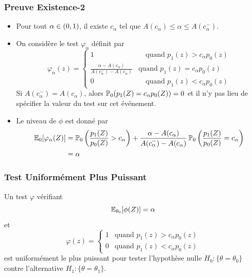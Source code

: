\begin{frame}
\frametitle{Preuve Existence-2}
\begin{itemize}
\item Pour tout $\alpha \in \left(0,1\right)$, il existe $c_\alpha$ tel que $A(c_\alpha) \leq \alpha \leq A(c_\alpha^-)$.
\item On considère le test $\varphi_\alpha$ définit par
$$
\varphi_\alpha(z)
=
\begin{cases}
1 & \quad \text{quand $p_1(z) > c_\alpha p_0(z)$} \\
\frac{\alpha - A(c_\alpha)}{A(c_\alpha^-)-A(c_\alpha)} & \text{quand $p_1(z) = c_\alpha p_0(z)$} \\
0  & \quad \text{quand $p_1(z) < c_\alpha p_0(z)$}
\end{cases}
$$
Si $A(c_\alpha^-)  = A(c_\alpha)$, alors $\operatorname{{\mathbb P}}_0( p_1(Z)= c_\alpha p_0(Z))=0$ et il n'y pas lieu de spécifier la valeur du test sur cet événement.
\item Le niveau de $\phi$ est donné par
\begin{align*}
\operatorname{{\mathbb E}}_0[\varphi_\alpha(Z)] &= \operatorname{{\mathbb P}}_0 \left( \frac{p_1(Z)}{p_0(Z)} > c_\alpha \right) + \frac{\alpha-A(c_\alpha)}{A(c_\alpha^-)-A(c_\alpha)}
\operatorname{{\mathbb P}}_0\left( \frac{p_1(Z)}{p_0(Z)} = c_\alpha \right) \\
&= \alpha
\end{align*}
\end{itemize}
\end{frame}


\begin{frame}
\frametitle{Test Uniformément Plus Puissant}
\begin{theo}
Un test $\varphi$ vérifiant
$$
\operatorname{{\mathbb E}}_{\theta_0}[\phi(Z)]= \alpha
$$
et
\[
\varphi(z)=
\begin{cases}
1 & \text{quand $p_1(z) > c_\alpha p_0(z)$} \\
0 & \text{quand $p_1(z) < c_\alpha p_0(z)$}
\end{cases}
\]
est \alert{uniformément le plus puissant} pour tester l'hypothèse nulle $H_0: \{\theta = \theta_0\}$ contre l'alternative $H_1: \{\theta = \theta_1\}$.
\end{theo}
\end{frame}

